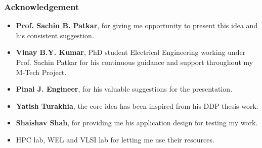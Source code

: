 
\begin{frame}
\frametitle{Acknowledgement}
\begin{itemize}
\item  	{\textbf{Prof. Sachin B. Patkar}, for giving me opportunity to present this idea and his consistent suggestion.}
\item  	{\textbf{Vinay B.Y. Kumar}, PhD student Electrical Engineering working under Prof. Sachin Patkar for his continuous guidance and support throughout my M-Tech Project.}
\item	{\textbf{Pinal J. Engineer}, for his valuable suggestions for the presentation.}
\item  	{\textbf{Yatish Turakhia}, the core idea has been inspired from his DDP thesis work.}
\item	{\textbf{Shaishav Shah}, for providing me his application design for testing my work.}
\item	{HPC lab, WEL and VLSI lab for letting me use their resources.}
\end{itemize}
\end{frame}